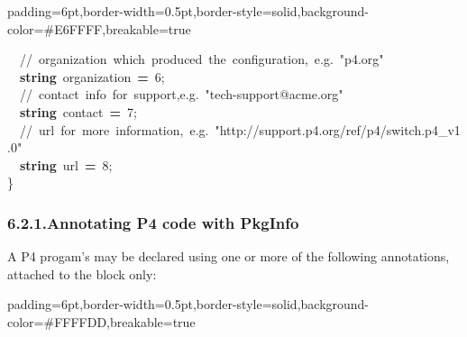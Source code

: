 \documentclass[11pt]{article}
\begin{document}
{\begin{mdbmargintb}{6pt}{6pt}
\begin{mdblock}{padding=6pt,border-width=0.5pt,border-style=solid,background-color=\#E6FFFF,breakable=true}
\begin{mdpre}
{{~~{//~organization~which~produced~the~configuration,~e.g.~"p4.org"}\\
~~{\bfseries{string}}~organization~{\bfseries{=}}~{6};\\
~~{//~contact~info~for~support,e.g.~"tech-support@acme.org"}\\
~~{\bfseries{string}}~contact~{\bfseries{=}}~{7};\\
~~{//~url~for~more~information,~e.g.~"http://support.p4.org/ref/p4/switch.p4\_v1.0"}\\
~~{\bfseries{string}}~url~{\bfseries{=}}~{8};\\
\}}}%
\end{mdpre}%
\end{mdblock}%
\end{mdbmargintb}%

\subsubsection{6.2.1.\hspace*{0.5em}Annotating P4 code with PkgInfo}\label{sec-annotating-p4-code-with-pkginfo}%

\noindent{}A P4 progam's  may be declared using one or more of the following
annotations, attached to the  block only:%

\begin{mdbmargintb}{6pt}{6pt}%
\begin{mdblock}{padding=6pt,border-width=0.5pt,border-style=solid,background-color=\#FFFFDD,breakable=true}%
\begin{mdpre}%
\end{mdpre}%
\end{mdblock}%
\end{mdbmargintb}%

}
\end{document}

